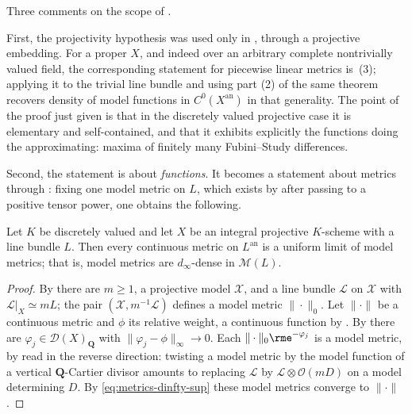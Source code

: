 Three comments on the scope of .

First, the projectivity hypothesis was used only in
, through a projective embedding. For a
proper $X$, and indeed over an arbitrary complete nontrivially valued
field, the corresponding statement for piecewise linear metrics is
\,(3); applying it to the trivial line bundle
and using part (2) of the same theorem recovers density of model functions
in $C^0(X^{\mathrm{an}})$ in that generality. The point of the proof just
given is that in the discretely valued projective case it is elementary and
self-contained, and that it exhibits explicitly the functions doing the
approximating: maxima of finitely many Fubini--Study differences.

Second, the statement is about \emph{functions}. It becomes a statement
about metrics through : fixing one model metric on
$L$, which exists by  after passing to a
positive tensor power, one obtains the following.

\begin{proposition}
\label{prop:metrics-model-metric-density}
Let $K$ be discretely valued and let $X$ be an integral projective
$K$-scheme with a line bundle $L$. Then every continuous metric on
$L^{\mathrm{an}}$ is a uniform limit of model metrics; that is, model
metrics are $d_\infty$-dense in $\mathcal M(L)$.
\end{proposition}

\begin{proof}
By  there are $m\ge1$, a projective model
$\mathcal X$, and a line bundle $\mathcal L$ on $\mathcal X$ with
$\mathcal L|_X\simeq mL$; the pair $(\mathcal X,m^{-1}\mathcal L)$
defines a model metric $\|\cdot\|_0$. Let $\|\cdot\|$ be a continuous
metric and $\phi$ its relative weight, a continuous function by
. By
 there are
$\varphi_j\in\mathcal D(X)_{\mathbf Q}$ with
$\|\varphi_j-\phi\|_\infty\to0$. Each $\|\cdot\|_0\rme^{-\varphi_j}$ is
a model metric, by  read in the reverse
direction: twisting a model metric by the model function of a vertical
$\mathbf Q$-Cartier divisor amounts to replacing $\mathcal L$ by
$\mathcal L\otimes\mathcal O(mD)$ on a model determining $D$. By
\eqref{eq:metrics-dinfty-sup} these model metrics converge to
$\|\cdot\|$.
\end{proof}

